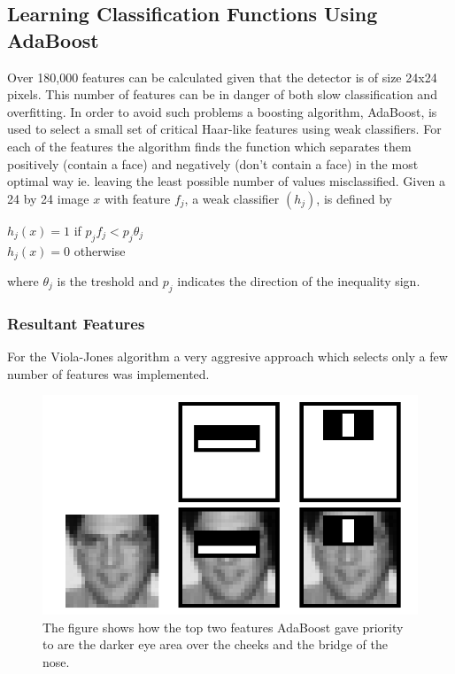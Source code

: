 \documentclass[12pt, letterpaper]{article}
\begin{document}
        \subsection{Learning Classification Functions Using AdaBoost}
            Over 180,000 features can be calculated given that
            the detector is of size 24x24 pixels. This number of
            features can be in danger of both slow classification
            and overfitting. In order to avoid such problems 
            a boosting algorithm, AdaBoost, is used to select a small
            set of critical Haar-like features using weak classifiers.
            For each of the features the algorithm finds the function which separates
            them positively (contain a face) and negatively (don’t
            contain a face) in the most optimal way ie. leaving the
            least possible number of values misclassified. Given a
            24 by 24 image \(x\) with feature \(f_j\), a weak classifier \((h_j)\), is 
            defined by 
            
            \begin{center}
                \(h_j(x)=1\) if \(p_j f_j < p_j\theta_j\) \\
                \(h_j(x)=0\) otherwise
            \end{center}
            where \(\theta_j\) is the treshold and \(p_j\) indicates
            the direction of the inequality sign.
            
            \subsubsection{Resultant Features}

                For the Viola-Jones algorithm a very aggresive
                approach which selects only a few number of features
                was implemented. 


                \begin{figure}[H]
                    \includegraphics[scale=0.3]{selectedFeatures.png}
                    \centering
                    \caption{The figure shows how the top two features AdaBoost
                    gave priority to are the darker eye area over the
                    cheeks and the bridge of the nose.}
                \end{figure}
\end{document}

